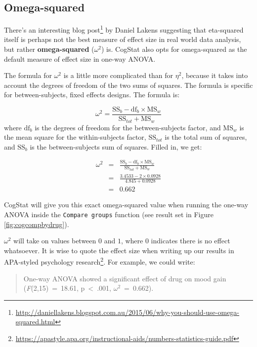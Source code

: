 \documentclass[
]{book}
\theoremstyle{definition}
\theoremstyle{definition}
\theoremstyle{definition}
\theoremstyle{definition}
\theoremstyle{remark}
\begin{document}
\hypertarget{omega-squared}{%
\subsection{Omega-squared}\label{omega-squared}}

There's an interesting blog post\footnote{\url{http://daniellakens.blogspot.com.au/2015/06/why-you-should-use-omega-squared.html}} by Daniel Lakens suggesting that eta-squared itself is perhaps not the best measure of effect size in real world data analysis, but rather \textbf{omega-squared} (\(\omega^2\)) is. CogStat also opts for omega-squared as the default measure of effect size in one-way ANOVA.

The formula for \(\omega^2\) is a little more complicated than for \(\eta^2\), because it takes into account the degrees of freedom of the two sums of squares. The formula is specific for between-subjects, fixed effects designs. The formula is:

\[
\omega^2 = \frac{\mbox{SS}_b - \mbox{df}_b \times \mbox{MS}_w}{\mbox{SS}_{tot} + \mbox{MS}_w}
\]
where \(\mbox{df}_b\) is the degrees of freedom for the between-subjects factor, and \(\mbox{MS}_w\) is the mean square for the within-subjects factor, \(\mbox{SS}_{tot}\) is the total sum of squares, and \(\mbox{SS}_b\) is the between-subjects sum of squares. Filled in, we get:

\[
\begin{array}{rcl}
\omega^2 &=& \frac{\mbox{SS}_b - \mbox{df}_b \times \mbox{MS}_w}{\mbox{SS}_{tot} + \mbox{MS}_w}
    \\
    &=& \frac{3.4533 - 2 \times 0.0928}{4.845 + 0.0928}
    \\
    &=& 0.662
\end{array}
\]

CogStat will give you this exact omega-squared value when running the one-way ANOVA inside the \texttt{Compare\ groups} function (see result set in Figure \ref{fig:cogcompbydrug}).

\(\omega^2\) will take on values between \(0\) and \(1\), where 0 indicates there is no effect whatsoever. It is wise to quote the effect size when writing up our results in APA-styled psychology research\footnote{\url{https://apastyle.apa.org/instructional-aids/numbers-statistics-guide.pdf}}. For example, we could write:

\begin{quote}
One-way ANOVA showed a significant effect of drug on mood gain (\emph{F}(2,15)~=~18.61, p~\textless~.001, \(\omega^2\)~=~0.662).
\end{quote}
\end{document}
